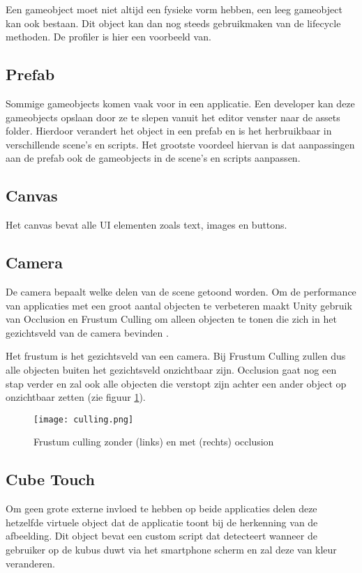 Een gameobject moet niet altijd een fysieke vorm hebben, een leeg gameobject kan ook bestaan. Dit object kan dan nog steeds gebruikmaken van de lifecycle methoden. De profiler is hier een voorbeeld van.

\subsection{Prefab}
Sommige gameobjects komen vaak voor in een applicatie. Een developer kan deze gameobjects opslaan door ze te slepen vanuit het editor venster naar de assets folder. Hierdoor verandert het object in een prefab en is het herbruikbaar in verschillende scene's en scripts. Het grootste voordeel hiervan is dat aanpassingen aan de prefab ook de gameobjects in de scene's en scripts aanpassen.

\subsection{Canvas}
Het canvas bevat alle UI elementen zoals text, images en buttons.

\subsection{Camera}
De camera bepaalt welke delen van de scene getoond worden. Om de performance van applicaties met een groot aantal objecten te verbeteren maakt Unity gebruik van Occlusion en Frustum Culling om alleen objecten te tonen die zich in het gezichtsveld van de camera bevinden \autocite{UnityCulling}.

Het frustum is het gezichtsveld van een camera. Bij Frustum Culling zullen dus alle objecten buiten het gezichtsveld onzichtbaar zijn. Occlusion gaat nog een stap verder en zal ook alle objecten die verstopt zijn achter een ander object op onzichtbaar zetten (zie figuur \ref{fig:culling}).

\begin{figure}
    \texttt{[image: culling.png]}
    \caption{Frustum culling zonder (links) en met (rechts) occlusion \autocite{UnityCulling}}
    \label{fig:culling}
\end{figure}

\subsection{Cube Touch}
Om geen grote externe invloed te hebben op beide applicaties delen deze hetzelfde virtuele object dat de applicatie toont bij de herkenning van de afbeelding. Dit object bevat een custom script dat detecteert wanneer de gebruiker op de kubus duwt via het smartphone scherm en zal deze van kleur veranderen.

